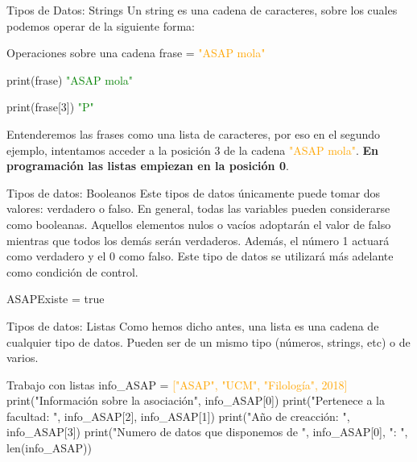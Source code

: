\documentclass{beamer}
\begin{document}
\begin{frame} {Tipos de Datos: Strings}
\label{datos:strings}
Un string es una cadena de caracteres, sobre los cuales podemos operar de la siguiente forma:
\begin{Programexample} {Operaciones sobre una cadena}
frase = \textcolor{orange}{"ASAP mola"}

print(frase) \hspace{3cm} \textcolor{green}{"ASAP mola"}

print(frase[3])\hspace{2.7cm} \textcolor{green}{"P"}
\end{Programexample}

Entenderemos las frases como una lista de caracteres, por eso en el segundo ejemplo, intentamos acceder a la posición 3 de la cadena  \textcolor{orange}{"ASAP mola"}.
\textbf{En programación las listas empiezan en la posición 0}.
\end{frame}
\begin{frame}{Tipos de datos: Booleanos}
Este tipos de datos únicamente puede tomar dos valores: verdadero o falso. En general, todas las variables pueden considerarse como booleanas. Aquellos elementos nulos o vacíos adoptarán el valor de falso mientras que todos los demás serán verdaderos. Además, el número 1 actuará como verdadero y el 0 como falso.
Este tipo de datos se utilizará más adelante como condición de control.

\begin{Programexample}
\centering ASAPExiste = true
\end{Programexample}
\end{frame}
\begin{frame}{Tipos de datos: Listas}
\label{datos:listas}
Como hemos dicho antes, una lista es una cadena de cualquier tipo de datos. Pueden ser de un mismo tipo (números, strings, etc) o de varios.

\begin{Programexample}{Trabajo con listas}
info\_ASAP = \textcolor{orange}{["ASAP", "UCM", "Filología", 2018]}
\newline\newline
print("Información sobre la asociación",  info\_ASAP[0])\newline
print("Pertenece a la facultad: ", info\_ASAP[2], info\_ASAP[1]) \newline
print("Año de creacción: ", info\_ASAP[3])\newline
print("Numero de datos que disponemos de ", info\_ASAP[0], ": ", len(info\_ASAP))
\end{Programexample}
\end{frame}
\end{document}
